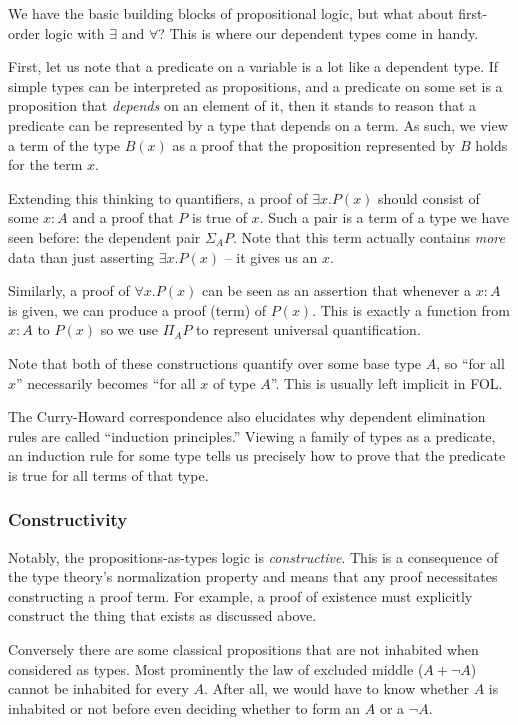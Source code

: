 We have the basic building blocks of propositional logic, but what about
first-order logic with $\exists$ and $\forall$? This is where our dependent
types come in handy.

First, let us note that a predicate on a variable is a lot like a dependent
type. If simple types can be interpreted as propositions, and a predicate on
some set is a proposition that \emph{depends} on an element of it, then it stands
to reason that a predicate can be represented by a type that depends on a term. As such, we
view a term of the type $B(x)$ as a proof that the proposition represented by
$B$ holds for the term $x$.

Extending this thinking to quantifiers, a proof of $\exists x. P(x)$ should
consist of some $x:A$ and a proof that $P$ is true of $x$.
Such a pair is a term of a type we have seen before:
the dependent pair $\Sigma_A P$. Note that this term actually contains
\emph{more} data than just asserting $\exists x. P(x)$ -- it gives us an $x$.

Similarly, a proof of $\forall x. P(x)$ can be seen as an assertion that
whenever a $x:A$ is given, we can produce a proof (term) of $P(x)$. This is
exactly a function from $x:A$ to $P(x)$ so we use $\Pi_A P$ to represent universal
quantification.

Note that both of these constructions quantify over some base type $A$, so ``for
all $x$'' necessarily becomes ``for all $x$ of type $A$''. This is usually left
implicit in FOL.

The Curry-Howard correspondence also elucidates why dependent elimination rules
are called ``induction principles.'' Viewing a family of types as a predicate,
an induction rule for some type tells us precisely how to prove that the
predicate is true for all terms of that type.

\subsubsection{Constructivity}
Notably, the propositions-as-types logic is \emph{constructive}. This is a
consequence of the type theory's normalization property and means that
any proof necessitates constructing a proof term. For example, a proof of
existence must explicitly construct the thing that exists as discussed above.

Conversely there are some classical propositions that are not inhabited when
considered as types. Most prominently the law of excluded middle ($A + \neg A$)
cannot be inhabited for every $A$. After all, we would have to know whether $A$
is inhabited or not before even deciding whether to form an $A$ or a $\neg A$.